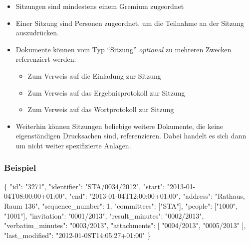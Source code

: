 \documentclass[,a4paper]{article}
\newenvironment{Shaded}{}{}
\newcommand{\DataTypeTok}[1]{\textcolor[rgb]{0.56,0.13,0.00}{{#1}}}
\newcommand{\DecValTok}[1]{\textcolor[rgb]{0.25,0.63,0.44}{{#1}}}
\newcommand{\StringTok}[1]{\textcolor[rgb]{0.25,0.44,0.63}{{#1}}}
\newcommand{\NormalTok}[1]{{#1}}
\begin{document}
\begin{itemize}
\item
  Sitzungen sind mindestens einem Gremium zugeordnet
\item
  Einer Sitzung sind Personen zugeordnet, um die Teilnahme an der
  Sitzung auszudrücken.
\item
  Dokumente können vom Typ ``Sitzung'' \emph{optional} zu mehreren
  Zwecken referenziert werden:

  \begin{itemize}
  \item
    Zum Verweis auf die Einladung zur Sitzung
  \item
    Zum Verweis auf das Ergebnisprotokoll zur Sitzung
  \item
    Zum Verweis auf das Wortprotokoll zur Sitzung
  \end{itemize}
\item
  Weiterhin können Sitzungen beliebige weitere Dokumente, die keine
  eigenständigen Drucksachen sind, referenzieren. Dabei handelt es sich
  dann um nicht weiter spezifizierte Anlagen.
\end{itemize}

\subsubsection{Beispiel}

\begin{Shaded}
\begin{Highlighting}[]
\NormalTok{\{}
    \DataTypeTok{"id"}\NormalTok{: }\StringTok{"3271"}\NormalTok{,}
    \DataTypeTok{"identifier"}\NormalTok{: }\StringTok{"STA/0034/2012"}\NormalTok{,}
    \DataTypeTok{"start"}\NormalTok{: }\StringTok{"2013-01-04T08:00:00+01:00"}\NormalTok{,}
    \DataTypeTok{"end"}\NormalTok{: }\StringTok{"2013-01-04T12:00:00+01:00"}\NormalTok{,}
    \DataTypeTok{"address"}\NormalTok{: }\StringTok{"Rathaus, Raum 136"}\NormalTok{,}
    \DataTypeTok{"sequence_number"}\NormalTok{: }\DecValTok{1}\NormalTok{,}
    \DataTypeTok{"committees"}\NormalTok{: [}\StringTok{"STA"}\NormalTok{],}
    \DataTypeTok{"people"}\NormalTok{: [}\StringTok{"1000"}\NormalTok{, }\StringTok{"1001"}\NormalTok{],}
    \DataTypeTok{"invitation"}\NormalTok{: }\StringTok{"0001/2013"}\NormalTok{,}
    \DataTypeTok{"result_minutes"}\NormalTok{: }\StringTok{"0002/2013"}\NormalTok{,}
    \DataTypeTok{"verbatim_minutes"}\NormalTok{: }\StringTok{"0003/2013"}\NormalTok{,}
    \DataTypeTok{"attachments"}\NormalTok{: [}
        \StringTok{"0004/2013"}\NormalTok{,}
        \StringTok{"0005/2013"}
    \NormalTok{],}
    \DataTypeTok{"last_modified"}\NormalTok{: }\StringTok{"2012-01-08T14:05:27+01:00"}
\NormalTok{\}}
\end{Highlighting}
\end{Shaded}
\end{document}
